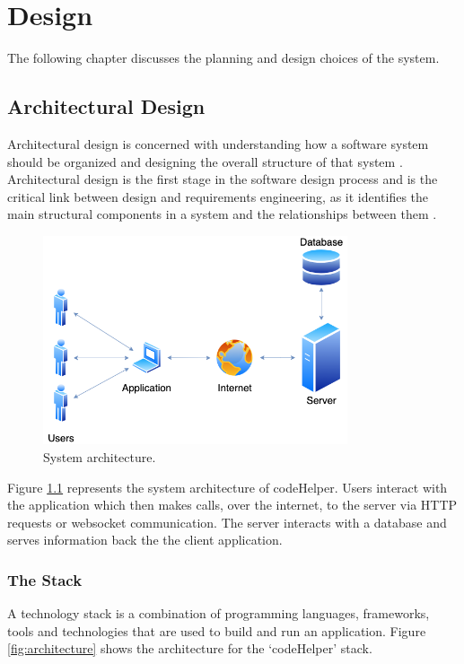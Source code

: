 \chapter{Design}
The following chapter discusses the planning and design choices of the system. 

\section{Architectural Design} \label{sec:architecture}
Architectural design is concerned with understanding how a software system should be organized and designing the overall structure of that system \cite{sommerville}. Architectural design is the first stage in the software design process and is the critical link between design and requirements engineering, as it identifies the main structural components in a system and the relationships between them \cite{sommerville}. 

\begin{figure}[H]
    \centering
    \includegraphics[width=0.8\textwidth]{7design/images/systemArchitecture.png}
    \caption{System architecture.}
    \label{fig:sysarchitecture}
\end{figure}

Figure \ref{fig:sysarchitecture} represents the system architecture of codeHelper. Users interact with the application which then makes calls, over the internet, to the server via HTTP requests or websocket communication. The server interacts with a database and serves information back the the client application.

\subsection{The Stack}

A technology stack is a combination of programming languages, frameworks, tools and technologies that are used to build and run an application. Figure \ref{fig:architecture} shows the architecture for the `codeHelper' stack. 

